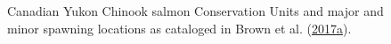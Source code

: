 \documentclass[11pt]{book}
\begin{document}
\begin{figure}[htb]

{\centering {} 

}

\caption{Canadian Yukon Chinook salmon Conservation Units and major and minor spawning locations as cataloged in Brown et al. (\protect\hyperlink{ref-brown_catalog_2017}{2017a}).}\label{fig:fig-map-spawn}
\end{figure}
\end{document}
